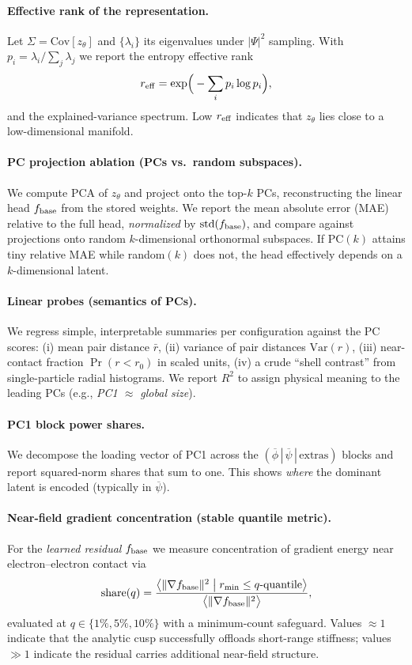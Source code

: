 \paragraph{Effective rank of the representation.}
Let $\Sigma=\mathrm{Cov}[z_\theta]$ and $\{\lambda_i\}$ its eigenvalues under $|\Psi|^{2}$ sampling. With $p_i=\lambda_i/\sum_j\lambda_j$ we report the entropy effective rank
\[
r_{\rm eff}=\exp\!\Big(-\sum_i p_i\log p_i\Big),
\]
and the explained-variance spectrum. Low $r_{\rm eff}$ indicates that $z_\theta$ lies close to a low-dimensional manifold.

\paragraph{PC projection ablation (PCs vs.\ random subspaces).}
We compute PCA of $z_\theta$ and project onto the top-$k$ PCs, reconstructing the linear head $f_{\rm base}$ from the stored weights. We report the mean absolute error (MAE) relative to the full head, \emph{normalized} by $\mathrm{std}(f_{\rm base})$, and compare against projections onto random $k$-dimensional orthonormal subspaces. If PC$(k)$ attains tiny relative MAE while random$(k)$ does not, the head effectively depends on a $k$-dimensional latent.

\paragraph{Linear probes (semantics of PCs).}
We regress simple, interpretable summaries per configuration against the PC scores:
(i) mean pair distance $\bar r$,
(ii) variance of pair distances $\mathrm{Var}(r)$,
(iii) near-contact fraction $\Pr(r<r_0)$ in scaled units,
(iv) a crude ``shell contrast'' from single-particle radial histograms.
We report $R^2$ to assign physical meaning to the leading PCs (e.g., \emph{PC1 $\approx$ global size}).

\paragraph{PC1 block power shares.}
We decompose the loading vector of PC1 across the $(\overline\phi\,|\,\overline\psi\,|\,\mathrm{extras})$ blocks and report squared-norm shares that sum to one. This shows \emph{where} the dominant latent is encoded (typically in $\overline\psi$).

\paragraph{Near-field gradient concentration (stable quantile metric).}
For the \emph{learned residual} $f_{\rm base}$ we measure concentration of gradient energy near electron--electron contact via
\[
\mathrm{share}(q)=\frac{\big\langle\|\nabla f_{\rm base}\|^2\;\big|\;r_{\min}\le q\text{-quantile}\big\rangle}{\big\langle\|\nabla f_{\rm base}\|^2\big\rangle},
\]
evaluated at $q\in\{1\%,5\%,10\%\}$ with a minimum-count safeguard. Values $\approx 1$ indicate that the analytic cusp successfully offloads short-range stiffness; values $\gg 1$ indicate the residual carries additional near-field structure.

